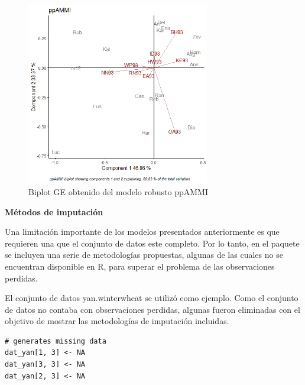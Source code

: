 \begin{itemize}[wide, nosep, labelindent = 0pt, topsep = 1ex]
\begin{tcolorbox}[skin=bicolor,
    colframe=aurometalsaurus,colback=backcolour,colbacklower=white,
    width=1\linewidth,
    height=0.7\linewidth,
    boxsep=-3mm]
\begin{figure}[H]
	\begin{center}
		\includegraphics[width=8cm]{./Graficos/ppAMMI.png}
	\end{center}
	\caption{Biplot GE obtenido del modelo robusto ppAMMI}
\end{figure}
\end{tcolorbox}
\end{itemize}

\textbf{Métodos de imputación}

Una limitación importante de los modelos presentados anteriormente es que requieren una que el conjunto de datos este completo. Por lo tanto, en el paquete se incluyen una serie de metodologías propuestas, algunas de las cuales no se encuentran disponible en R, para superar el problema de las observaciones perdidas. 

El conjunto de datos yan.winterwheat se utilizó como ejemplo. Como el conjunto de datos no contaba con observaciones perdidas, algunas fueron eliminadas con el objetivo de mostrar las metodologías de imputación incluidas.
\begin{tcolorbox}[colframe=aurometalsaurus,colback=backcolour,colbacklower=white,
    width=1\linewidth,
    height=0.15\linewidth,
    boxsep=-3mm]
\begin{lstlisting}
# generates missing data
dat_yan[1, 3] <- NA
dat_yan[3, 3] <- NA
dat_yan[2, 3] <- NA
\end{lstlisting}
\end{tcolorbox}

